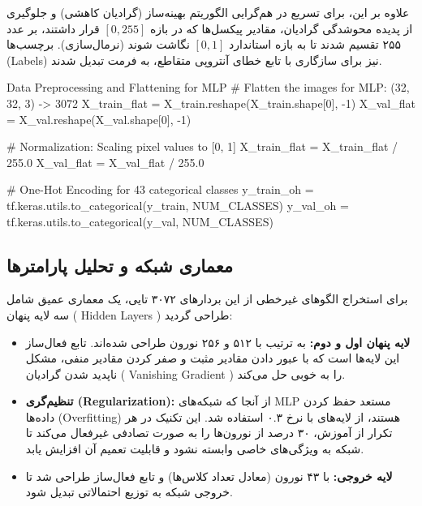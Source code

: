 \documentclass{article}
\begin{document}
علاوه بر این، برای تسریع در هم‌گرایی الگوریتم بهینه‌ساز (گرادیان کاهشی) و جلوگیری از پدیده محوشدگی گرادیان، مقادیر پیکسل‌ها که در بازه $[0, 255]$ قرار داشتند، بر عدد ۲۵۵ تقسیم شدند تا به بازه استاندارد $[0, 1]$ نگاشت شوند (نرمال‌سازی). برچسب‌ها (Labels) نیز برای سازگاری با تابع خطای آنتروپی متقاطع، به فرمت  تبدیل شدند.

\begin{latin}
	\begin{vscodewindow}{Data Preprocessing and Flattening for MLP}
# Flatten the images for MLP: (32, 32, 3) -> 3072
X_train_flat = X_train.reshape(X_train.shape[0], -1)
X_val_flat = X_val.reshape(X_val.shape[0], -1)

# Normalization: Scaling pixel values to [0, 1]
X_train_flat = X_train_flat / 255.0
X_val_flat = X_val_flat / 255.0

# One-Hot Encoding for 43 categorical classes
y_train_oh = tf.keras.utils.to_categorical(y_train, NUM_CLASSES)
y_val_oh = tf.keras.utils.to_categorical(y_val, NUM_CLASSES)
	\end{vscodewindow}
\end{latin}

\subsection{معماری شبکه و تحلیل پارامترها}
برای استخراج الگوهای غیرخطی از این بردارهای ۳۰۷۲ تایی، یک معماری عمیق شامل سه لایه پنهان ( Hidden Layers ) طراحی گردید:
\begin{itemize}
	\item \textbf{لایه پنهان اول و دوم:} به ترتیب با ۵۱۲ و ۲۵۶ نورون طراحی شده‌اند. تابع فعال‌ساز این لایه‌ها  است که با عبور دادن مقادیر مثبت و صفر کردن مقادیر منفی، مشکل ناپدید شدن گرادیان ( Vanishing Gradient ) را به خوبی حل می‌کند.
	\item \textbf{تنظیم‌گری (Regularization):} از آنجا که شبکه‌های MLP مستعد حفظ کردن داده‌ها (Overfitting) هستند، از لایه‌های  با نرخ ۰.۳ استفاده شد. این تکنیک در هر تکرار از آموزش، ۳۰ درصد از نورون‌ها را به صورت تصادفی غیرفعال می‌کند تا شبکه به ویژگی‌های خاصی وابسته نشود و قابلیت تعمیم آن افزایش یابد.
	\item \textbf{لایه خروجی:} با ۴۳ نورون (معادل تعداد کلاس‌ها) و تابع فعال‌ساز  طراحی شد تا خروجی شبکه به توزیع احتمالاتی تبدیل شود.
\end{itemize}
\end{document}
